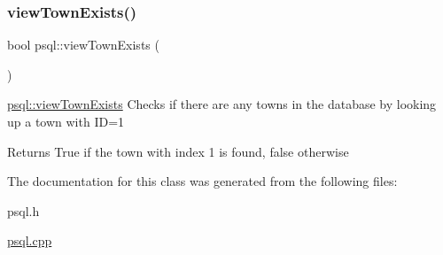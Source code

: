 \subsubsection{\texorpdfstring{view\+Town\+Exists()}{viewTownExists()}}
{\footnotesize\ttfamily bool psql\+::view\+Town\+Exists (\begin{DoxyParamCaption}{ }\end{DoxyParamCaption})}



\hyperlink{classpsql_aae95eb2a505c1b0b7b4d5671926ecd2f}{psql\+::view\+Town\+Exists} Checks if there are any towns in the database by looking up a town with ID=1 

\begin{DoxyReturn}{Returns}
True if the town with index 1 is found, false otherwise 
\end{DoxyReturn}


The documentation for this class was generated from the following files\+:\begin{DoxyCompactItemize}
\item 
psql.\+h\item 
\hyperlink{psql_8cpp}{psql.\+cpp}\end{DoxyCompactItemize}
